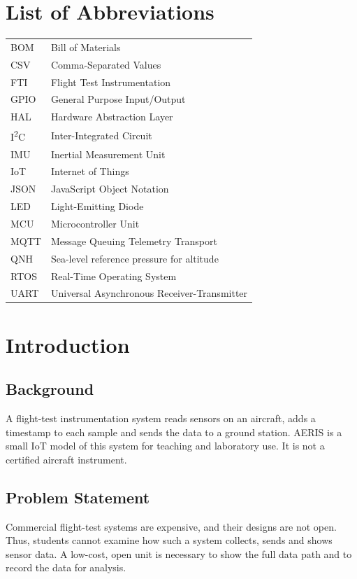 \documentclass[12pt,a4paper]{report}
\begin{document}
\chapter*{List of Abbreviations}
\begin{tabular}{@{}ll@{}}
BOM   & Bill of Materials\\
CSV   & Comma-Separated Values\\
FTI   & Flight Test Instrumentation\\
GPIO  & General Purpose Input/Output\\
HAL   & Hardware Abstraction Layer\\
I\textsuperscript{2}C & Inter-Integrated Circuit\\
IMU   & Inertial Measurement Unit\\
IoT   & Internet of Things\\
JSON  & JavaScript Object Notation\\
LED   & Light-Emitting Diode\\
MCU   & Microcontroller Unit\\
MQTT  & Message Queuing Telemetry Transport\\
QNH   & Sea-level reference pressure for altitude\\
RTOS  & Real-Time Operating System\\
UART  & Universal Asynchronous Receiver-Transmitter\\
\end{tabular}

\clearpage
{}

\chapter{Introduction}
\section{Background}
A flight-test instrumentation system reads sensors on an aircraft, adds a timestamp to each sample and sends the data to a ground station. AERIS is a small IoT model of this system for teaching and laboratory use. It is not a certified aircraft instrument.

\section{Problem Statement}
Commercial flight-test systems are expensive, and their designs are not open. Thus, students cannot examine how such a system collects, sends and shows sensor data. A low-cost, open unit is necessary to show the full data path and to record the data for analysis.
\end{document}
